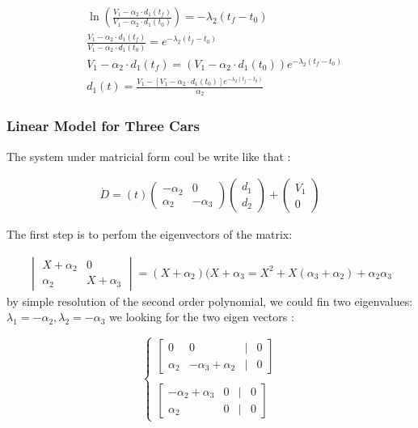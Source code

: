 \documentclass{article}
\begin{document}
	\begin{align*}
		&\ln\left( \frac{V_1 - \alpha_2 \cdot d_1(t_f)}{V_1 - \alpha_2 \cdot d_1(t_0)} \right)  = -\lambda_2( t_f-t_0)\\
		&\frac{V_1 - \alpha_2 \cdot d_1(t_f)}{V_1 - \alpha_2 \cdot d_1(t_0)}  = e^{-\lambda_2( t_f-t_0)} \\
		&V_1 - \alpha_2 \cdot d_1(t_f)   = (V_1 - \alpha_2 \cdot d_1(t_0))e^{-\lambda_2( t_f-t_0)} \\
		&\boxed{
			d_1(t) = \frac{V_1 - [V_1 - \alpha_2 \cdot d_1(t_0)]e^{-\lambda_2( t_f-t_0)}}{\alpha_2}
		}
	\end{align*}

	\subsubsection{Linear Model for Three Cars}
	\label{eq:EDO2}
	The system under matricial form coul be write like that :
	
	\begin{align*}
		\dot{D}=(t)\begin{pmatrix}
			-\alpha_2 & 0 \\
			\alpha_2 & -\alpha_3
		\end{pmatrix}
		\begin{pmatrix}
			d_1 \\
			d_2
		\end{pmatrix} + 
		\begin{pmatrix}
			V_1 \\
			0
		\end{pmatrix}
	\end{align*}
	
	The first step is to perfom the eigenvectors of the matrix:
	
	\begin{align*}
		\begin{vmatrix}
			X+\alpha_2 & 0 \\
			\alpha_2 & X+\alpha_3
		\end{vmatrix} = (X+\alpha_2)(X+\alpha_3=X^2+X(\alpha_3+\alpha_2)+\alpha_2\alpha_3
	\end{align*}
	by simple resolution of the second order polynomial, we could fin two eigenvalues: \newline
	$\lambda_1=-\alpha_2, \lambda_2 = -\alpha_3$
	we looking for the two eigen vectors : 
	
	\[
	\begin{cases}
		\begin{bmatrix}
			0 & 0 & | & 0 \\
			\alpha_2 & -\alpha_3 + \alpha_2 & | & 0
		\end{bmatrix} \\ \\
		\begin{bmatrix}
			-\alpha_2 + \alpha_3 & 0 & | & 0 \\
			\alpha_2 & 0 & | & 0
		\end{bmatrix}
	\end{cases}
	\]
	
\end{document}

